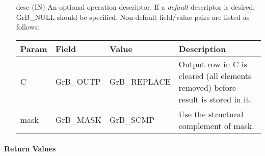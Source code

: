 \begin{itemize}[leftmargin=1.1in]
    \item[{\sf desc}] ({\sf IN}) An optional operation descriptor. If
    a \emph{default} descriptor is desired, {\sf GrB\_NULL} should be
    specified. Non-default field/value pairs are listed as follows:  \\

    \begin{tabular}{lllp{2.5in}}
        Param & Field  & Value & Description \\
        \hline
        {\sf C}    & {\sf GrB\_OUTP} & {\sf GrB\_REPLACE} &   Output row in 
        {\sf C} is cleared (all elements removed) before result is stored in it. \\
        
        {\sf mask} & {\sf GrB\_MASK} & {\sf GrB\_SCMP} & Use the structural 
        complement of {\sf mask}. \\
    \end{tabular}

\end{itemize}

\paragraph{Return Values}

